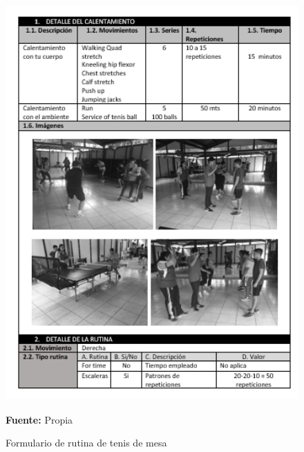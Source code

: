 \begin{figure}[H]
	\caption{Formulario de rutina de tenis de mesa}
	\label{fig:frmRoutTen}
	\centering	\includegraphics[width=445px,height=600px]{graphics/resultados/rutina-tennis.PNG} \\
	\textbf{Fuente:} Propia
\end{figure}
